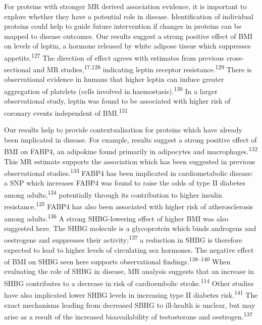 \documentclass[11pt,twoside]{bristolthesis}
\begin{document}
For proteins with stronger MR derived association evidence, it is important to explore whether they have a potential role in disease. Identification of individual proteins could help to guide future intervention if changes in proteins can be mapped to disease outcomes. Our results suggest a strong positive effect of BMI on levels of leptin, a hormone released by white adipose tissue which suppresses appetite.\textsuperscript{127} The direction of effect agrees with estimates from previous cross-sectional and MR studies,\textsuperscript{17,128} indicating leptin receptor resistance.\textsuperscript{129} There is observational evidence in humans that higher leptin can induce greater aggregation of platelets (cells involved in haemostasis).\textsuperscript{130} In a larger observational study, leptin was found to be associated with higher risk of coronary events independent of BMI.\textsuperscript{131}

Our results help to provide contextualisation for proteins which have already been implicated in disease. For example, results suggest a strong positive effect of BMI on FABP4, an adipokine found primarily in adipocytes and macrophages.\textsuperscript{132} This MR estimate supports the association which has been suggested in previous observational studies.\textsuperscript{133} FABP4 has been implicated in cardiometabolic disease: a SNP which increases FABP4 was found to raise the odds of type II diabetes among adults,\textsuperscript{134} potentially through its contribution to higher insulin resistance.\textsuperscript{135} FABP4 has also been associated with higher risk of atherosclerosis among adults.\textsuperscript{136} A strong SHBG-lowering effect of higher BMI was also suggested here. The SHBG molecule is a glycoprotein which binds androgens and oestrogens and suppresses their activity;\textsuperscript{137} a reduction in SHBG is therefore expected to lead to higher levels of circulating sex hormones. The negative effect of BMI on SHBG seen here supports observational findings.\textsuperscript{138--140} When evaluating the role of SHBG in disease, MR analysis suggests that an increase in SHBG contributes to a decrease in risk of cardioembolic stroke.\textsuperscript{114} Other studies have also implicated lower SHBG levels in increasing type II diabetes risk.\textsuperscript{141} The exact mechanisms leading from decreased SBHG to ill-health is unclear, but may arise as a result of the increased bioavailability of testosterone and oestrogen.\textsuperscript{137}
\end{document}
